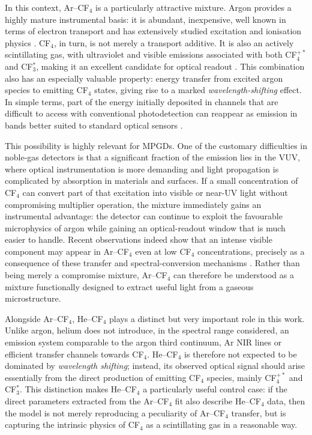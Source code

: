 \documentclass[12pt,a4paper]{article}
\begin{document}
In this context, Ar--CF$_4$ is a particularly attractive mixture. Argon provides a highly mature instrumental basis: it is abundant, inexpensive, well known in terms of electron transport and has extensively studied excitation and ionisation physics \cite{zatsarinny2013comparisons,biagi1999monte}. CF$_4$, in turn, is not merely a transport additive. It is also an actively scintillating gas, with ultraviolet and visible emissions associated with both CF$_4^{+*}$ and CF$_3^*$, making it an excellent candidate for optical readout \cite{washida1983emission,morozov2010photon,lehaut2015scintillation}. This combination also has an especially valuable property: energy transfer from excited argon species to emitting CF$_4$ states, giving rise to a marked \emph{wavelength-shifting} effect. In simple terms, part of the energy initially deposited in channels that are difficult to access with conventional photodetection can reappear as emission in bands better suited to standard optical sensors \cite{amedo2023observation,gonzlezdaz2024primary,veenhof2025primary}.

This possibility is highly relevant for MPGDs. One of the customary difficulties in noble-gas detectors is that a significant fraction of the emission lies in the VUV, where optical instrumentation is more demanding and light propagation is complicated by absorption in materials and surfaces. If a small concentration of CF$_4$ can convert part of that excitation into visible or near-UV light without compromising multiplier operation, the mixture immediately gains an instrumental advantage: the detector can continue to exploit the favourable microphysics of argon while gaining an optical-readout window that is much easier to handle. Recent observations indeed show that an intense visible component may appear in Ar--CF$_4$ even at low CF$_4$ concentrations, precisely as a consequence of these transfer and spectral-conversion mechanisms \cite{amedo2023observation,amedo2023scintillation,veenhof2025primary}. Rather than being merely a compromise mixture, Ar--CF$_4$ can therefore be understood as a mixture functionally designed to extract useful light from a gaseous microstructure.

Alongside Ar--CF$_4$, He--CF$_4$ plays a distinct but very important role in this work. Unlike argon, helium does not introduce, in the spectral range considered, an emission system comparable to the argon third continuum, Ar NIR lines or efficient transfer channels towards CF$_4$. He--CF$_4$ is therefore not expected to be dominated by \emph{wavelength shifting}; instead, its observed optical signal should arise essentially from the direct production of emitting CF$_4$ species, mainly CF$_4^{+*}$ and CF$_3^*$. This distinction makes He--CF$_4$ a particularly useful control case: if the direct parameters extracted from the Ar--CF$_4$ fit also describe He--CF$_4$ data, then the model is not merely reproducing a peculiarity of Ar--CF$_4$ transfer, but is capturing the intrinsic physics of CF$_4$ as a scintillating gas in a reasonable way.
\end{document}
